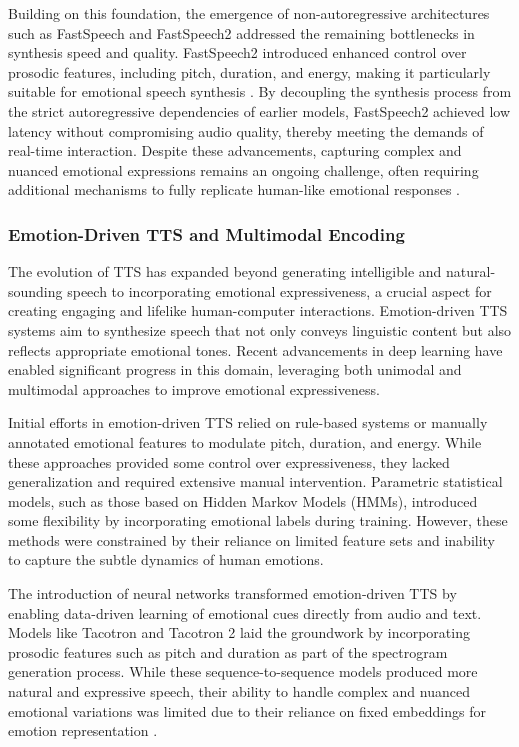 Building on this foundation, the emergence of non-autoregressive architectures such as FastSpeech and FastSpeech2 addressed the remaining bottlenecks in synthesis speed and quality. FastSpeech2 introduced enhanced control over prosodic features, including pitch, duration, and energy, making it particularly suitable for emotional speech synthesis \cite{ren2020fastspeech}. By decoupling the synthesis process from the strict autoregressive dependencies of earlier models, FastSpeech2 achieved low latency without compromising audio quality, thereby meeting the demands of real-time interaction. Despite these advancements, capturing complex and nuanced emotional expressions remains an ongoing challenge, often requiring additional mechanisms to fully replicate human-like emotional responses \cite{liu2021fasttalker}.

\subsubsection{Emotion-Driven TTS and Multimodal Encoding}

The evolution of TTS has expanded beyond generating intelligible and natural-sounding speech to incorporating emotional expressiveness, a crucial aspect for creating engaging and lifelike human-computer interactions. Emotion-driven TTS systems aim to synthesize speech that not only conveys linguistic content but also reflects appropriate emotional tones. Recent advancements in deep learning have enabled significant progress in this domain, leveraging both unimodal and multimodal approaches to improve emotional expressiveness.

Initial efforts in emotion-driven TTS relied on rule-based systems or manually annotated emotional features to modulate pitch, duration, and energy. While these approaches provided some control over expressiveness, they lacked generalization and required extensive manual intervention. Parametric statistical models, such as those based on Hidden Markov Models (HMMs), introduced some flexibility by incorporating emotional labels during training. However, these methods were constrained by their reliance on limited feature sets and inability to capture the subtle dynamics of human emotions\cite{tan2021survey}.

The introduction of neural networks transformed emotion-driven TTS by enabling data-driven learning of emotional cues directly from audio and text. Models like Tacotron and Tacotron 2 laid the groundwork by incorporating prosodic features such as pitch and duration as part of the spectrogram generation process. While these sequence-to-sequence models produced more natural and expressive speech, their ability to handle complex and nuanced emotional variations was limited due to their reliance on fixed embeddings for emotion representation .

